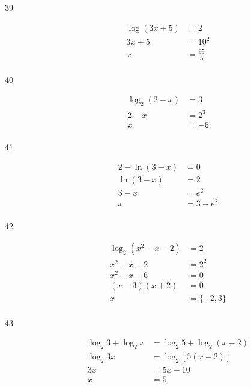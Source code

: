 \documentclass{exam}
\begin{document}
\begin{description}
      \item[39] 
        \begin{align*}
          \log (3x + 5) &= 2 \\
          3x + 5        &= 10^2 \\
          x             &= \boxed{\frac{95}{3}} \\
        \end{align*}

      \item[40] 
        \begin{align*}
          \log_2 (2 - x) &= 3 \\
          2 - x          &= 2^3 \\
          x              &= \boxed{-6} \\
        \end{align*}

      \item[41] 
        \begin{align*}
          2 - \ln(3 - x) &= 0 \\
          \ln(3 - x)     &= 2 \\
          3 - x          &= e^2 \\
          x              &= \boxed{3 - e^2} \\
        \end{align*}

      \item[42] 
        \begin{align*}
          \log_2(x^2 - x - 2) &= 2 \\
          x^2 - x - 2         &= 2^2 \\
          x^2 - x - 6         &= 0 \\
          (x - 3)(x + 2)      &= 0 \\
          x                   &= \boxed{\{ - 2, 3\}} \\
        \end{align*}

      \item[43] 
        \begin{align*}
          \log_2 3 + \log_2 x &= \log_2 5 + \log_2(x - 2) \\
          \log_2 3x           &= \log_2 [5 (x - 2)] \\
          3x                  &= 5x - 10 \\
          x                   &= \boxed{5} \\
        \end{align*}


\end{description}
\end{document}
